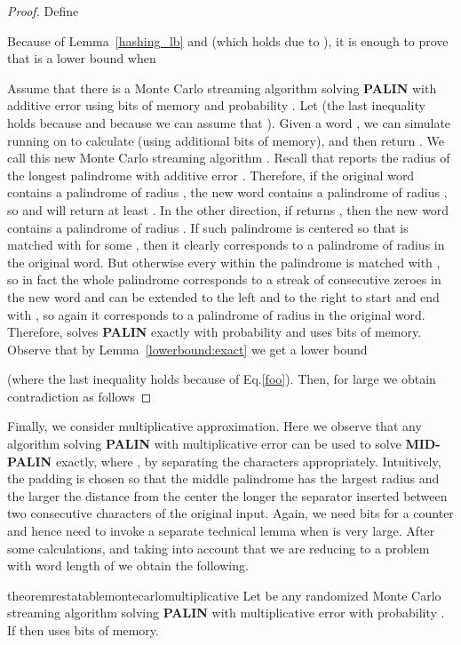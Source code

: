 \documentclass{article}[11pt,letter]
\newcommand{\midpalin}[1][n]{{\bf MID-PALIN}\xspace}
\newcommand{\palin}[1][n]{{\bf PALIN}\xspace}
\begin{document}
\begin{proof}
Define 

Because of Lemma~\ref{hashing_lb} and 
(which holds due to ),
it is enough to prove that  is a lower bound when 
 
Assume that there is a Monte Carlo streaming algorithm  solving \palin with additive error  using  
bits of memory and probability . 
Let  (the last inequality holds because  and because we can assume that ).  Given a word , we can simulate running 
on  to calculate  (using  additional bits of memory), and then return .
We call this new Monte Carlo streaming algorithm .
Recall that  reports the radius of the longest palindrome with additive error . Therefore, if the original word contains
a palindrome of radius , the new word contains a palindrome of radius , so  and 
will return at least . In the other direction, if  returns , then the new word contains a palindrome of radius .
If such palindrome is centered so that  is matched with  for some , then
it clearly corresponds to a palindrome of radius  in the original word. But otherwise every
 within the palindrome is matched with , so in fact the whole palindrome corresponds to a streak
of consecutive zeroes in the new word and can be extended to the left and to the right to start and end
with , so again it corresponds to a palindrome of radius  in the original word.
Therefore,  solves \palin[n'] exactly with probability
 and uses
 bits of memory. Observe that by Lemma~\ref{lowerbound:exact} we get a lower bound 

 (where the last inequality holds because of Eq.\eqref{foo}). Then, for large 
we obtain contradiction as follows

\end{proof}


Finally, we consider multiplicative approximation. Here we observe that any algorithm solving
\palin with multiplicative error  can be used  to solve \midpalin[2n'] exactly, where
, by separating the characters appropriately.
Intuitively, the padding is chosen so that the middle palindrome has the largest radius and
the larger the distance from the center the longer the separator inserted between two consecutive
characters of the original input. Again, we need  bits for a counter and hence need
to invoke a separate technical lemma when  is very large. After some calculations,
and taking into account that we are reducing to a problem with word length of 
we obtain the following.

\begin{restatable}{theorem}{restatablemontecarlomultiplicative}
\label{th:montecarlo_multiplicative_lowerbound}
Let  be any randomized Monte Carlo streaming algorithm solving \palin with multiplicative error 
with probability . If  then  uses  bits of memory.
\end{restatable}
\end{document}
